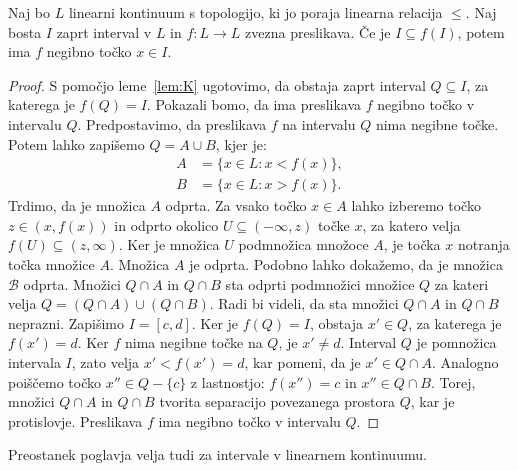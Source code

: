 \documentclass[../TG_magistrsko_delo_sections.tex]{subfiles}
\begin{document}
\begin{lema}
Naj bo $L$ linearni kontinuum s topologijo, ki jo poraja linearna relacija $\leq$. Naj bosta $I$ zaprt interval v $L$ in $f:L \to L$ zvezna preslikava. Če je $I \subseteq f(I)$, potem ima $f$ negibno točko $x \in I$.
\end{lema}
\begin{proof}
S pomočjo leme~\ref{lem:K} ugotovimo, da obstaja zaprt interval $Q \subseteq I$, za katerega je $f(Q) = I$. Pokazali bomo, da ima preslikava $f$ negibno točko v intervalu $Q$. Predpostavimo, da preslikava $f$ na intervalu $Q$ nima negibne točke. Potem lahko zapišemo $Q = A \cup B$, kjer je:
\begin{equation*} %
\begin{split}
A &= \{x \in L : x < f(x)\}, \\ 
B &= \{x \in L : x > f(x)\}.
\end{split}
\end{equation*}
Trdimo, da je množica $A$ odprta. Za vsako točko $x \in A$ lahko izberemo točko $z \in (x, f(x))$ in odprto okolico $U \subseteq  (-\infty, z)$ točke $x$, za katero velja $f(U) \subseteq (z, \infty)$. Ker je množica $U$ podmnožica množoce $A$, je točka $x$ notranja točka množice $A$. Množica $A$ je odprta. Podobno lahko dokažemo, da je množica $\mathcal{B}$ odprta. Množici $Q \cap A$ in $Q \cap B$ sta odprti podmnožici množice $Q$ za kateri velja $Q = (Q \cap A) \cup (Q \cap B)$. Radi bi videli, da sta množici $Q \cap A$ in $Q \cap B$ neprazni. Zapišimo $I = [c, d]$. Ker je $f(Q) = I$, obstaja $x' \in Q$, za katerega je $f(x') =d$. Ker $f$ nima negibne točke na $Q$, je $x' \neq d$. Interval $Q$ je pomnožica intervala $I$, zato velja $x' < f(x') = d$, kar pomeni, da je $x' \in Q \cap A$. Analogno poiščemo točko $x'' \in Q - \{c\}$ z lastnostjo: $f(x'') = c$ in $x'' \in Q \cap B$. Torej, množici $Q \cap A$ in $Q \cap B$ tvorita separacijo povezanega prostora $Q$, kar je protislovje. Preslikava $f$ ima negibno točko v intervalu $Q$.
\end{proof}

Preostanek poglavja velja tudi za intervale v linearnem kontinuumu.
\end{document}
